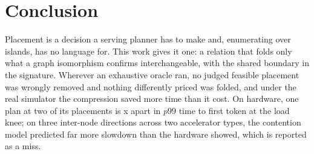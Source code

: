 \section{Conclusion}
\label{sec:conclusion}

Placement is a decision a serving planner has to make and, enumerating over
islands, has no language for. This work gives it one: a relation that folds
only what a graph isomorphism confirms interchangeable, with the shared
boundary in the signature. Wherever an exhaustive oracle ran, no judged
feasible placement was wrongly removed and nothing differently priced was
folded, and under the real simulator the compression saved more time than it
cost. On
hardware, one plan at two of its placements is \egfiveTtwoOverTone{}x apart in
$p99$ time to first token at the load knee; on three inter-node directions
across two accelerator types, the contention model predicted far more slowdown
than the hardware showed, which is reported as a miss.
